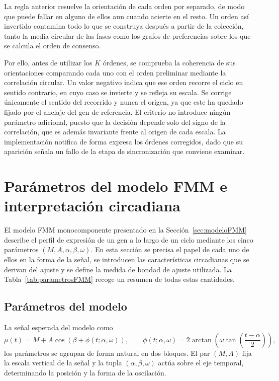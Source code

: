 \documentclass[12pt, a4paper]{report}
\begin{document}
La regla anterior resuelve la orientación de cada orden por separado, de modo que puede fallar en alguno de ellos aun cuando acierte en el resto. Un orden así invertido contamina todo lo que se construya después a partir de la colección, tanto la media circular de las fases como los grafos de preferencias sobre los que se calcula el orden de consenso.

Por ello, antes de utilizar los \(K\) órdenes, se comprueba la coherencia de sus orientaciones comparando cada uno con el orden preliminar mediante la correlación circular. Un valor negativo indica que ese orden recorre el ciclo en sentido contrario, en cuyo caso se invierte y se refleja su escala. Se corrige únicamente el sentido del recorrido y nunca el origen, ya que este ha quedado fijado por el anclaje del gen de referencia. El criterio no introduce ningún parámetro adicional, puesto que la decisión depende solo del signo de la correlación, que es además invariante frente al origen de cada escala. La implementación notifica de forma expresa los órdenes corregidos, dado que su aparición señala un fallo de la etapa de sincronización que conviene examinar.

\fi

\section{Parámetros del modelo FMM e interpretación circadiana}
\label{sec:ParametrosFMM}

El modelo FMM monocomponente presentado en la Sección~\ref{sec:modeloFMM} describe el perfil de expresión de un gen a lo largo de un ciclo mediante los cinco parámetros \((M,A,\alpha,\beta,\omega)\). En esta sección se precisa el papel de cada uno de ellos en la forma de la señal, se introducen las características circadianas que se derivan del ajuste y se define la medida de bondad de ajuste utilizada. La Tabla~\ref{tab:parametrosFMM} recoge un resumen de todas estas cantidades.
\subsection{Parámetros del modelo}

La señal esperada del modelo como
\[
\mu(t)=M+A\cos\!\left(\beta+\phi(t;\alpha,\omega)\right),
\qquad
\phi(t;\alpha,\omega)=2\arctan\!\left(\omega\tan\left(\frac{t-\alpha}{2}\right)\right),
\]
los parámetros se agrupan de forma natural en dos bloques. El par \((M,A)\) fija la escala vertical de la señal y la tupla \((\alpha,\beta,\omega)\) actúa sobre el eje temporal, determinando la posición y la forma de la oscilación.
\end{document}
